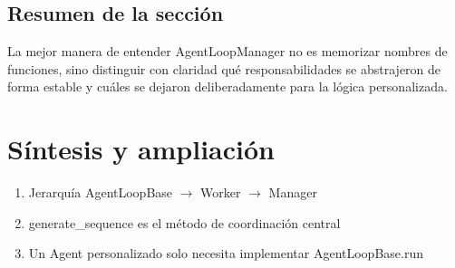 \documentclass[a4paper]{article}
\begin{document}
\subsection{Resumen de la sección}
La mejor manera de entender AgentLoopManager no es memorizar nombres de funciones, sino distinguir con claridad qué responsabilidades se abstrajeron de forma estable y cuáles se dejaron deliberadamente para la lógica personalizada.

\newpage
\section{Síntesis y ampliación}
\begin{enumerate}
  \item Jerarquía AgentLoopBase $\to$ Worker $\to$ Manager
  \item generate\_sequence es el método de coordinación central
  \item Un Agent personalizado solo necesita implementar AgentLoopBase.run
\end{enumerate}
\end{document}
